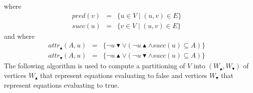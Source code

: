 where%
\begin{eqnarray*}
pred(v) &=&\{u\in V\mid (u,v)\in E\} \\
succ(u) &=&\{v\in V\mid (u,v)\in E\}
\end{eqnarray*}%
and where%
\begin{eqnarray*}
attr_{\blacktriangle }(A,u) &=&\{\lnot u\blacktriangledown \vee \left( \lnot
u\blacktriangle \wedge succ(u)\subseteq A\right) \} \\
attr_{\blacktriangledown }(A,u) &=&\{\lnot u\blacktriangle \vee \left( \lnot
u\blacktriangledown \wedge succ(u)\subseteq A\right) \}
\end{eqnarray*}%
The following algorithm is used to compute a partitioning of $V$ into $%
\left( W_{\blacktriangle },W_{\blacktriangledown }\right) $ of vertices $%
W_{\blacktriangle }$ that represent equations evaluating to false and
vertices $W_{\blacktriangledown }$ that represent equations evaluating to
true.%

